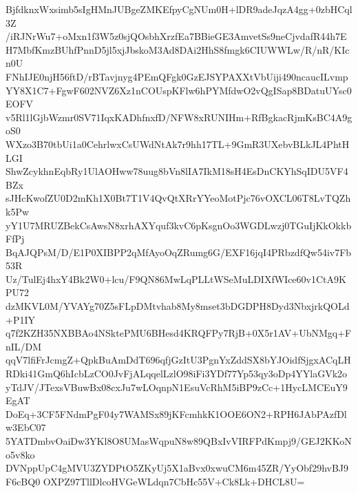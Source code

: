 BjfdknxWxsimb5sIgHMnJUBgeZMKEfpyCgNUm0H+lDR9adeJqzA4gg+0zbHCql3Z
/iRJNrWu7+oMxn1f3W5z0sjQOsbhXrzfEa7BBieGE3AmvetSs9neCjvdafR44h7E
H7MbfKmzBUhfPnnD5jl5xjJbskoM3Ad8DAi2HhS8fmgk6CIUWWLw/R/nR/KIcn0U
FNhIJE0njH56ftD/rBTavjnyg4PEmQFgk0GzEJSYPAXXtVbUiji490ncaucILvmp
YY8X1C7+FgwF602NVZ6Xz1nCOUspKFlw6hPYMfdwO2vQgISap8BDatuUYsc0EOFV
v5Rl1lGjbWzmr0SV71IqxKADhfnxfD/NFW8xRUNIHm+RfBgkacRjmKsBC4A9goS0
WXzo3B70tbUi1a0CehrlwxCsUWdNtAk7r9hh17TL+9GmR3UXebvBLkJL4PhtHLGI
ShwZcykhnEqbRy1UlAOHww78uug8bVn8lIA7IkM18sH4EsDnCKYhSqIDU5VF4BZx
sJHcKwofZU0D2mKh1X0Bt7T1V4QvQtXRrYYeoMotPjc76vOXCL06T8LvTQZhk5Pw
yY1U7MRUZBekCsAwsN8xrhAXYquf3kvC6pKsgnOo3WGDLwzj0TGuIjKkOkkbFfPj
BqAJQPsM/D/E1P0XIBPP2qMfAyoOqZRumg6G/EXF16jqI4PRbzdfQw54iv7Fb53R
Uz/TulEj4hxY4Bk2W0+lcu/F9QN86MwLqPLLtWSeMuLDIXfWIce60v1CtA9KPU72
dzMKVL0M/YVAYg70Z5sFLpDMtvhab8My8mset3bDGDPH8Dyd3NbxjrkQOLd+P1IY
q7f2KZH35NXBBAo4NSktePMU6BHesd4KRQFPy7RjB+0X5r1AV+UbNMgq+FnIL/DM
qqV7lfiFrJcmgZ+QpkBuAmDdT696qfjGzItU3PgnYxZddSX8bYJOidfSjgxACqLH
RDki41GmQ6hIcbLzCO0JvFjALqqelLzlO98iFi3YDf77Yp53qy3oDp4YYlaGVk2o
yTdJV/JTexsVBuwBx08cxJu7wLOqnpN1EsuVcRhM5iBP9zCc+1HycLMCEuY9EgAT
DoEq+3CF5FNdmPgF04y7WAMSx89jKFcmhkK1OOE6ON2+RPH6JAbPAzfDlw3EbC07
5YATDmbvOaiDw3YKl8O8UMasWqpuN8w89QBxIvVIRFPdKmpj9/GEJ2KKoNo5v8ko
DVNppUpC4gMVU3ZYDPtO5ZKyUj5X1aBvx0xwuCM6m45ZR/YyObf29hvBJ9F6cBQ0
OXPZ97TllDlcoHVGeWLdqn7CbHc55V+Ck8Lk+DHCL8U=
